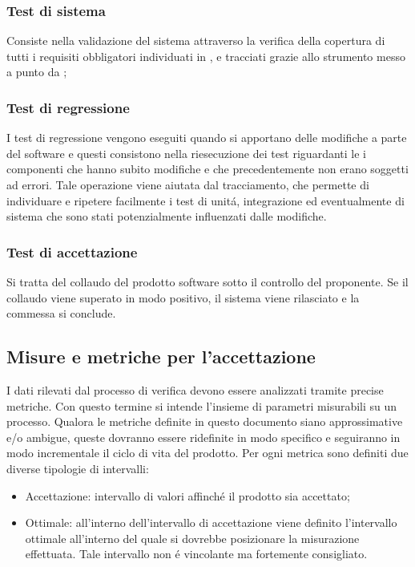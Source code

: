 \subsubsection{Test di sistema}
Consiste nella validazione del sistema attraverso la verifica della copertura di tutti i requisiti obbligatori individuati in \infoAR, e tracciati  grazie allo strumento messo a punto da \gruppo;
\subsubsection{Test di regressione}
I test di regressione vengono eseguiti quando si apportano delle modifiche a parte del software e questi consistono nella riesecuzione dei test riguardanti le i componenti che hanno subito modifiche e che precedentemente non erano soggetti ad errori.
Tale operazione viene aiutata dal tracciamento, che permette di individuare e ripetere facilmente i test di unit\'a, integrazione ed eventualmente di sistema che sono stati potenzialmente influenzati dalle modifiche.
\subsubsection{Test di accettazione}
Si tratta del collaudo del prodotto software sotto il controllo del proponente. Se il collaudo viene superato in modo positivo, il sistema viene rilasciato e la commessa si conclude.
\subsection{Misure e metriche per l'accettazione}
I dati rilevati dal processo di verifica devono essere analizzati tramite precise metriche.
Con questo termine si intende l'insieme di parametri misurabili su un processo. Qualora le metriche definite in questo documento siano approssimative e/o ambigue, queste dovranno essere ridefinite in modo specifico e seguiranno in modo incrementale il ciclo di vita del prodotto.
Per ogni metrica sono definiti due diverse tipologie di intervalli:
\begin{itemize}
\item Accettazione: intervallo di valori affinché il prodotto sia accettato;
\item Ottimale: all'interno dell'intervallo di accettazione viene definito l'intervallo ottimale all'interno del quale si dovrebbe posizionare la misurazione effettuata. Tale intervallo non \'e vincolante ma fortemente consigliato.
\end{itemize}
